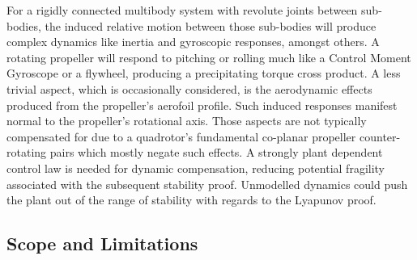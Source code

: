 \par
For a rigidly connected multibody system with revolute joints between sub-bodies, the induced relative motion between those sub-bodies will produce complex dynamics like inertia and gyroscopic responses, amongst others. A rotating propeller will respond to pitching or rolling much like a Control Moment Gyroscope \cite{cmg} or a flywheel, producing a precipitating torque cross product. A less trivial aspect, which is occasionally considered, is the aerodynamic effects produced from the propeller's aerofoil profile. Such induced responses manifest normal to the propeller's rotational axis. Those aspects are not typically compensated for due to a quadrotor's fundamental co-planar propeller counter-rotating pairs which mostly negate such effects. A strongly plant dependent control law is needed for dynamic compensation, reducing potential fragility associated with the subsequent stability proof. Unmodelled dynamics could push the plant out of the range of stability with regards to the Lyapunov proof. 
\subsection{Scope and Limitations}
\label{subsec:intro.foreword.scopeandlim}
